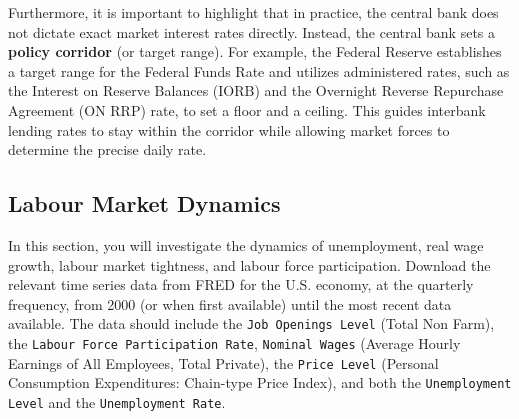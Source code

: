 \documentclass[dvipsnames,11pt]{article}
\begin{document}
\begin{enumerate}
\begin{solution}
                    Furthermore, it is important to highlight that in practice, the central bank does not dictate exact market interest rates directly. Instead, the central bank sets a \textbf{policy corridor} (or target range). For example, the Federal Reserve establishes a target range for the Federal Funds Rate and utilizes administered rates, such as the Interest on Reserve Balances (IORB) and the Overnight Reverse Repurchase Agreement (ON RRP) rate, to set a floor and a ceiling. This guides interbank lending rates to stay within the corridor while allowing market forces to determine the precise daily rate.
                \end{solution}       
            \end{enumerate}


    \subsection{Labour Market Dynamics}

        In this section, you will investigate the dynamics of unemployment, real wage growth, labour market tightness, and labour force participation. Download the relevant time series data from FRED for the U.S. economy, at the quarterly frequency, from 2000 (or when first available) until the most recent data available. The data should include the \texttt{Job Openings Level} (Total Non Farm), the \texttt{Labour Force Participation Rate}, \texttt{Nominal Wages} (Average Hourly Earnings of All Employees, Total Private), the \texttt{Price Level} (Personal Consumption Expenditures: Chain-type Price Index), and both the \texttt{Unemployment Level} and the \texttt{Unemployment Rate}.
\end{document}
